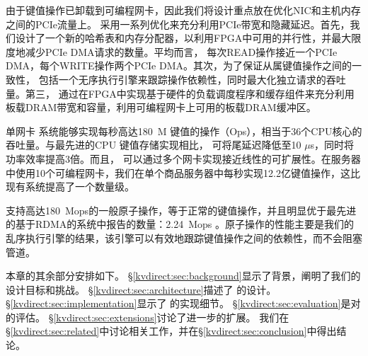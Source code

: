 由于键值操作已卸载到可编程网卡，因此我们将设计重点放在优化NIC和主机内存之间的PCIe流量上。 \oursys{} 采用一系列优化来充分利用PCIe带宽和隐藏延迟。首先，我们设计了一个新的哈希表和内存分配器，以利用FPGA中可用的并行性，并最大限度地减少PCIe DMA请求的数量。平均而言，\oursys{} 每次READ操作接近一个PCIe DMA，每个WRITE操作两个PCIe DMA。其次，为了保证从属键值操作之间的一致性，\oursys{} 包括一个无序执行引擎来跟踪操作依赖性，同时最大化独立请求的吞吐量。第三，\oursys{} 通过在FPGA中实现基于硬件的负载调度程序和缓存组件来充分利用板载DRAM带宽和容量，利用可编程网卡上可用的板载DRAM缓冲区。

单网卡 \oursys{} 系统能够实现每秒高达180~M 键值的操作（Ops），相当于36个CPU核心的吞吐量\cite {li2016full}。与最先进的CPU 键值存储实现相比，\oursys{} 可将尾延迟降低至10 $\mu$s，同时将功率效率提高3倍。而且，\oursys{} 可以通过多个网卡实现接近线性的可扩展性。在服务器中使用10个可编程网卡，我们在单个商品服务器中每秒实现12.2亿键值操作，这比现有系统提高了一个数量级。

\oursys{} 支持高达180~Mops的一般原子操作，等于正常的键值操作，并且明显优于最先进的基于RDMA的系统中报告的数量：2.24~Mops \cite {kalia2014using}。原子操作的性能主要是我们的乱序执行引擎的结果，该引擎可以有效地跟踪键值操作之间的依赖性，而不会阻塞管道。

本章的其余部分安排如下。 \S \ref {kvdirect:sec:background}显示了背景，阐明了我们的设计目标和挑战。 \S \ref {kvdirect:sec:architecture}描述了\oursys{} 的设计。 \S \ref {kvdirect:sec:implementation}显示了\oursys{} 的实现细节。 \S \ref {kvdirect:sec:evaluation}是对\oursys{} 的评估。 \S \ref {kvdirect:sec:extensions}讨论了进一步的扩展。 我们在\S \ref {kvdirect:sec:related}中讨论相关工作，并在\S \ref {kvdirect:sec:conclusion}中得出结论。
